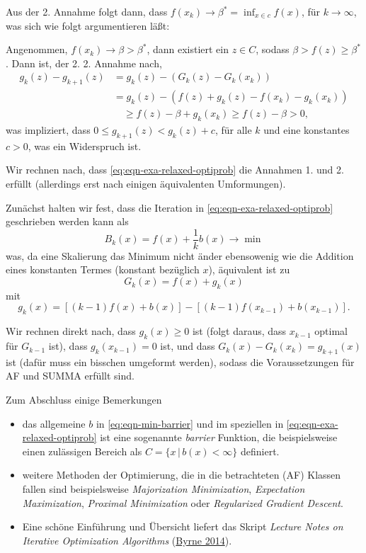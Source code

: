 \documentclass[
]{book}
\providecommand{\tightlist}{%
  \setlength{\itemsep}{0pt}\setlength{\parskip}{0pt}}
\theoremstyle{definition}
\theoremstyle{definition}
\theoremstyle{definition}
\theoremstyle{definition}
\theoremstyle{remark}
\begin{document}
Aus der 2. Annahme folgt dann, dass \(f(x_k) \to \beta^*=\inf_{x\in c}f(x)\), für \(k\to \infty\), was sich wie folgt argumentieren läßt:

Angenommen, \(f(x_k) \to \beta > \beta^*\), dann existiert ein \(z\in C\), sodass \(\beta > f(z) \geq \beta^*\). Dann ist, der 2. 2. Annahme nach,
\begin{equation*}
\begin{split}
g_k(z) - g_{k+1}(z) &= g_k(z) - (G_k(z)-G_k(x_k))    \\
&=g_k(z) - (f(z) + g_k(z) - f(x_k) - g_k(x_k)) \\
&\quad \geq f(z) - \beta + g_k(x_k) \geq f(z) - \beta > 0,
\end{split}
\end{equation*}
was impliziert, dass \(0\leq g_{k+1}(z)<g_k(z)+c\), für alle \(k\) und eine konstantes \(c>0\), was ein Widerspruch ist.

Wir rechnen nach, dass \eqref{eq:eqn-exa-relaxed-optiprob} die Annahmen 1. und 2. erfüllt (allerdings erst nach einigen äquivalenten Umformungen).

Zunächst halten wir fest, dass die Iteration in \eqref{eq:eqn-exa-relaxed-optiprob} geschrieben werden kann als
\begin{equation}
B_k(x) = f(x) + \frac 1k b(x) \to \min
\label{eq:eqn-min-barrier}
\end{equation}
was, da eine Skalierung das Minimum nicht änder ebensowenig wie die Addition eines konstanten Termes (konstant bezüglich \(x\)),
äquivalent ist zu
\begin{equation*}
G_k(x) = f(x) + g_k(x)
\end{equation*}
mit
\begin{equation*}
g_k(x) = [(k-1)f(x) + b(x)] - [(k-1)f(x_{k-1}) + b(x_{k-1})].
\end{equation*}

Wir rechnen direkt nach, dass \(g_k(x)\geq 0\) ist (folgt daraus, dass \(x_{k-1}\) optimal für \(G_{k-1}\) ist), dass \(g_k(x_{k-1})=0\) ist, und dass \(G_k(x)-G_k(x_k)=g_{k+1}(x)\) ist (dafür muss ein bisschen umgeformt werden), sodass die Voraussetzungen für AF und SUMMA erfüllt sind.

Zum Abschluss einige Bemerkungen

\begin{itemize}
\tightlist
\item
  das allgemeine \(b\) in \eqref{eq:eqn-min-barrier} und im speziellen in \eqref{eq:eqn-exa-relaxed-optiprob} ist eine sogenannte \emph{barrier} Funktion, die beispielsweise einen zulässigen Bereich als \(C=\{x\,|\, b(x)< \infty\}\) definiert.
\item
  weitere Methoden der Optimierung, die in die betrachteten (AF) Klassen fallen sind beispielsweise \emph{Majorization Minimization}, \emph{Expectation Maximization}, \emph{Proximal Minimization} oder \emph{Regularized Gradient Descent}.
\item
  Eine schöne Einführung und Übersicht liefert das Skript \emph{Lecture Notes on Iterative Optimization Algorithms} (\protect\hyperlink{ref-Byr14}{Byrne 2014}).
\end{itemize}
\end{document}
